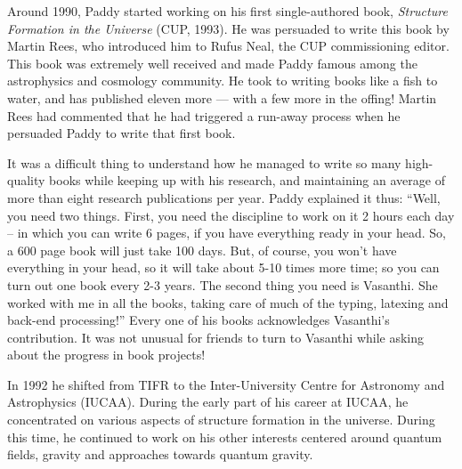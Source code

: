 \documentclass[prd, preprint, longbibliography, 12pt]{revtex4-2}
\begin{document}
Around 1990, Paddy started working on his first single-authored book,
\textit{Structure Formation in the Universe} (CUP, 1993).
He was persuaded to write this book by Martin Rees, who introduced him
to  Rufus Neal, the CUP commissioning editor.
This book was extremely well received and made Paddy famous among the
astrophysics and cosmology community.
He took to writing books like a fish to water, and has published
eleven more --- with a few more in the offing!
Martin Rees had commented that he had triggered a run-away process
when he persuaded Paddy to write that first book. 


It was a difficult thing to understand how he managed to write so many
high-quality books while keeping up with his research, and maintaining
an average of more than eight research publications per year.
Paddy explained it thus: ``Well, you need two things. First, you need
the discipline to work on it 2 hours each day -- in which you can
write 6 pages, if you have everything ready in your head.
So, a 600 page book will just take 100 days.
But, of course,  you won't have everything in your head, so it will
take about 5-10 times more time; so you can turn out one book every
2-3 years.
The second thing you need is Vasanthi.
She worked with me in all the books, taking care of much of the
typing, latexing and back-end processing!''
Every one of his books acknowledges Vasanthi's contribution. 
It was not unusual for friends to turn to Vasanthi while asking about
the progress in book projects!

In 1992 he shifted from TIFR to the Inter-University Centre for
Astronomy and Astrophysics (IUCAA).
During the early part of his career at IUCAA, he concentrated on
various aspects of structure formation in the universe.
During this time, he continued to work on his other interests centered
around quantum fields, gravity and approaches towards quantum
gravity.  
\end{document}
